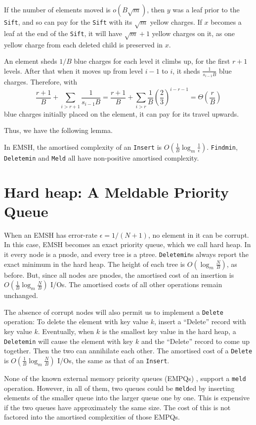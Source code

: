 If the number of elements moved is $o(B\sqrt{m})$, then $y$ was a leaf prior
to the {\tt Sift}, and so can pay for the {\tt Sift} with its $\sqrt{m}$ yellow charges.
If $x$ becomes a leaf at the end of the {\tt Sift}, it will have $\sqrt{m}+1$ yellow charges 
on it, as one yellow charge from each deleted child is preserved in $x$.

An element sheds $1/B$ blue charges for each level it climbs up, for the first
$r+1$ levels. After that when it moves up from level $i-1$ to $i$, it
sheds $\frac{1}{s_{i-1}B}$ blue charges. Therefore, with 
\[\frac{r+1}{B}+\sum_{i>r+1}\frac{1}{s_{i-1}B}=\frac{r+1}{B}+\sum_{i>r}\frac{1}{B}
 \left(\frac{2}{3}\right)^{i - r -1}=\Theta{\left(\frac{r}{B}\right)}\]
blue charges initially placed on the element, it can pay for its travel upwards. 

Thus, we have the following lemma.
\begin{lemma}
In EMSH, the amortised complexity of an {\tt Insert} is $O(\frac{1}{B}\log_{m} \frac{1}{\epsilon})$. {\tt Findmin}, {\tt Deletemin} and {\tt Meld} all have non-positive amortised complexity.
\end{lemma}

\section{Hard heap: A Meldable Priority Queue}
\label{hard:emsh}
When an EMSH has error-rate $\epsilon=1/(N+1)$, no element in it can be corrupt.
In this case, EMSH becomes an exact priority queue, which we call hard heap.
In it every node is a pnode, and every tree is a ptree. 
{\tt Deletemin}s always report the exact minimum in the hard heap. 
The height of each tree is $O(\log_{m}\frac{N}{B})$, as before.
But, since all nodes are pnodes, the amortised cost of an insertion is
$O(\frac{1}{B}\log_{m}\frac{N}{B})$ I/Os. The amortised costs of all 
other operations remain unchanged.

The absence of corrupt nodes will also permit us to implement a {\tt Delete}
operation: To delete the element with key value $k$, insert a ``Delete'' record
with key value $k$. Eventually, when $k$ is the smallest key value in the hard heap,
a {\tt Deletemin} will cause
the element with key $k$ and the ``Delete'' record to come up together. Then the
two can annihilate each other. The amortised cost of a {\tt Delete} is
$O(\frac{1}{B}\log_{m}\frac{N}{B})$ I/Os, the same as that of an {\tt Insert}.
 
None of the known external memory priority queues (EMPQs) \cite{Arge03,FJKT99,KS96},
support a {\tt meld} operation. However, in all of them, two queues could be {\tt meld}ed by 
inserting elements of the smaller queue into the larger queue one by one.
This is expensive if the two queues have approximately the same size.
The cost of this is not factored into the amortised complexities of those
EMPQs. 

